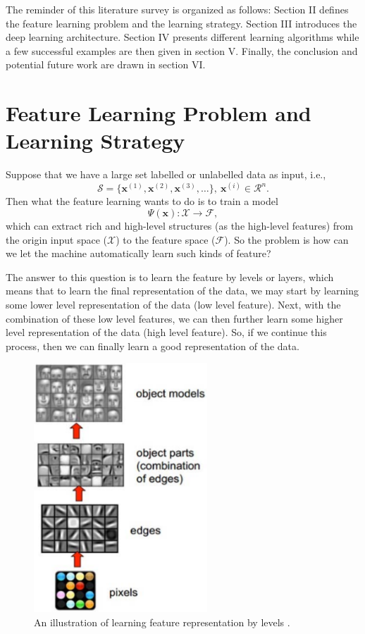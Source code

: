 \documentclass[conference]{IEEEtran}
\begin{document}
The reminder of this literature survey is organized as follows: Section II defines the feature learning problem and the learning strategy. Section III introduces the deep learning architecture. Section IV presents different learning algorithms while a few successful examples are then given in section V. Finally, the conclusion and potential future work are drawn in section VI.

\section{Feature Learning Problem and Learning Strategy}

Suppose that we have a large set labelled or unlabelled data as input, i.e., $$\mathcal{S}=\{\mathbf{x}^{(1)},\mathbf{x}^{(2)},\mathbf{x}^{(3)},\ldots\}, \ \mathbf{x}^{(i)}\in\mathcal{R}^n.$$
Then what the feature learning wants to do is to train a model 
\begin{equation}
\Psi(\mathbf{x}):\mathcal{X} \rightarrow \mathcal{F},
\end{equation}
which can extract rich and high-level structures (as the high-level features) from the origin input space ($\mathcal{X}$) to the feature space ($\mathcal{F}$). So the problem is how can we let the machine automatically learn such kinds of feature?

The answer to this question is to learn the feature by levels or layers, which means that to learn the final representation of the data, we may start by learning some lower level representation of the data (low level feature). Next, with the combination of these low level features, we can then further learn some higher level representation of the data (high level feature). So, if we continue this process, then we can finally learn a good representation of the data.

\begin{figure}[t]
\centering
\includegraphics[width=65mm]{feat_level.pdf}
\caption{An illustration of learning feature representation by levels \cite{face}.}
\label{fig:feat_level}
\end{figure}
\end{document}
